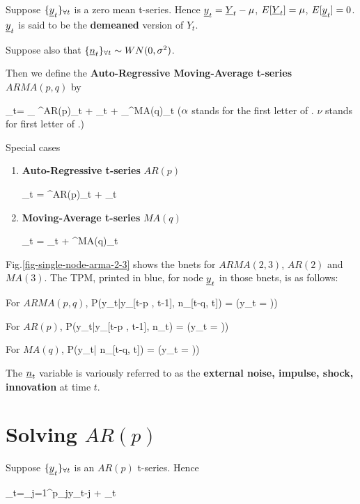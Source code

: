 Suppose $\tseries{\rvy_t}$
is a zero mean t-series. Hence
$\rvy_t= \rvY_t-\mu$,
$E[\rvY_t]=\mu$,
$E[\rvy_t]=0$.
$\rvy_t$ is said to be the {\bf demeaned}
version of $Y_t$.

Suppose also that
$\tseries{\rvn_t}\sim WN(0, \s^2)$.

Then we define the
{\bf Auto-Regressive Moving-Average
t-series} $ARMA(p,q)$ by

\beq
\rvy_t=
_
{\caly^{AR(p)}_t}
+ \rvn_t +
_{\caly^{MA(q)}_t}
\label{eq-arma-def}
\eeq($\alpha$ stands for
the first  letter
of .
$\nu$ stands for first
 letter of .)


Special cases
\begin{enumerate}
\item  {\bf Auto-Regressive t-series} $AR(p)$

\beq
\rvy_t =
\caly^{AR(p)}_t
+ \rvn_t
\label{eq-ar-def}
\eeq

\item {\bf Moving-Average t-series}
 $MA(q)$

\beq
\rvy_t = \rvn_t  +
\caly^{MA(q)}_t
\label{eq-ma-def}
\eeq
\end{enumerate}




 Fig.\ref{fig-single-node-arma-2-3}
shows the bnets for
$ARMA(2,3)$, $AR(2)$ and $MA(3)$.
The TPM, printed in blue,
for node $\rvy_t$
in those bnets,
is as follows:

For $ARMA(p,q)$,
\beq\color{blue}
P(y_t|y_{[t-p   , t-1]},
n_{[t-q, t]})
=
\indi(y_t = ))
\eeq

For $AR(p)$,
\beq\color{blue}
P(y_t|y_{[t-p   , t-1]},
n_{t})
=
\indi(y_t = ))
\eeq

For $MA(q)$,
\beq\color{blue}
P(y_t|
n_{[t-q, t]})
=
\indi(y_t = ))
\eeq



The $\rvn_t$ variable
is variously referred to as the
{\bf external noise, impulse,
shock, innovation}
at time $t$.

\section{Solving $AR(p)$}

Suppose $\tseries{\rvy_t}$ is an $AR(p)$
t-series. Hence

\beq
\rvy_t=\sum_{j=1}^p\alp_jy_{t-j} + \rvn_t
\eeq


